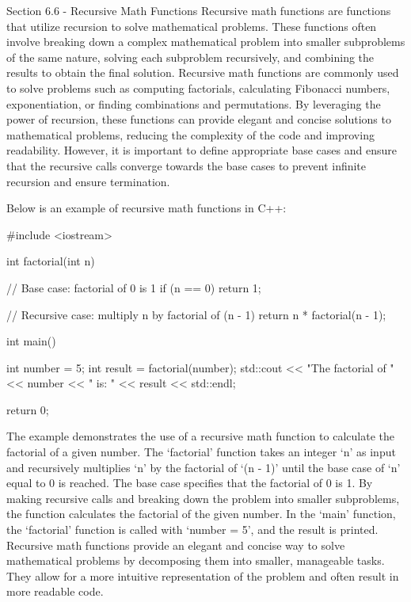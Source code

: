 \begin{notes}{Section 6.6 - Recursive Math Functions}
    Recursive math functions are functions that utilize recursion to solve mathematical problems. These functions often involve breaking down a complex mathematical problem into smaller subproblems of the same nature, solving each subproblem recursively, and combining the results to obtain the final solution. Recursive math functions are commonly 
    used to solve problems such as computing factorials, calculating Fibonacci numbers, exponentiation, or finding combinations and permutations. By leveraging the power of recursion, these functions can provide elegant and concise solutions to mathematical problems, reducing the complexity of the code and improving readability. However, it is 
    important to define appropriate base cases and ensure that the recursive calls converge towards the base cases to prevent infinite recursion and ensure termination.
    
    \begin{highlight}
        Below is an example of recursive math functions in C++:
    
        \begin{code}[C++]
        #include <iostream>
    
        int factorial(int n) {
            // Base case: factorial of 0 is 1
            if (n == 0)
                return 1;
        
            // Recursive case: multiply n by factorial of (n - 1)
            return n * factorial(n - 1);
        }
        
        int main() {
            int number = 5;
            int result = factorial(number);
            std::cout << "The factorial of " << number << " is: " 
            << result << std::endl;
        
            return 0;
        }
        \end{code}
        The example demonstrates the use of a recursive math function to calculate the factorial of a given number. The `factorial' function takes an integer `n' as input and recursively multiplies `n' by the factorial of `(n - 1)' until the base case of `n' equal to 0 is reached. The base case specifies that the factorial of 0 is 1. By making recursive 
        calls and breaking down the problem into smaller subproblems, the function calculates the factorial of the given number. In the `main' function, the `factorial' function is called with `number = 5', and the result is printed. Recursive math functions provide an elegant and concise way to solve mathematical problems by decomposing them into smaller, 
        manageable tasks. They allow for a more intuitive representation of the problem and often result in more readable code.
    \end{highlight}
\end{notes}

